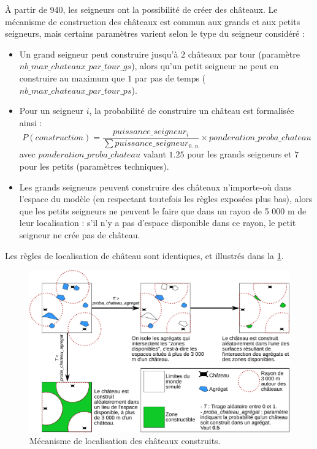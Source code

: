 À partir de 940, les seigneurs ont la possibilité de créer des châteaux.
Le mécanisme de construction des châteaux est commun aux grands et aux petits seigneurs, mais certains paramètres varient selon le type du seigneur considéré :
\begin{itemize}
	\item Un grand seigneur peut construire jusqu'à $2$ châteaux par tour (paramètre $nb\_max\_chateaux\_par\_tour\_gs$), alors qu'un petit seigneur ne peut en construire au maximum que $1$ par pas de temps ($nb\_max\_chateaux\_par\_tour\_ps$).
	\item Pour un seigneur $i$, la probabilité de construire un château est formalisée ainsi :\\
	$$ P \left( construction \right) =  \frac{puissance\_seigneur_{i}}{\sum{puissance\_seigneur_{0..n}}} \times ponderation\_proba\_chateau $$ avec $ponderation\_proba\_chateau$ valant $1.25$ pour les grands seigneurs et $7$ pour les petits (paramètres techniques).
	\item Les grands seigneurs peuvent construire des châteaux n'importe-où dans l'espace du modèle (en respectant toutefois les règles exposées plus bas), alors que les petits seigneurs ne peuvent le faire que dans un rayon de 5 000 m de leur localisation : s'il n'y a pas d'espace disponible dans ce rayon, le petit seigneur ne crée pas de château.
\end{itemize}

Les règles de localisation de château sont identiques, et illustrés dans la \cref{fig:construction-chateaux}.

\begin{figure}[H]
	\centering
	\includegraphics[width=\linewidth]{img/construction_chateaux.pdf}
	\caption{Mécanisme de localisation des châteaux construits.}
	\label{fig:construction-chateaux}
\end{figure}

